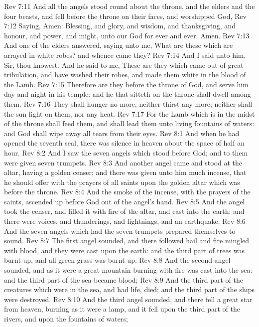 \vs Rev 7:11 And all the angels stood round about the throne, and  the elders and the four beasts, and fell before the throne on their faces, and worshipped God,
\vs Rev 7:12 Saying, Amen: Blessing, and glory, and wisdom, and thanksgiving, and honour, and power, and might,  unto our God for ever and ever. Amen.
\vs Rev 7:13 And one of the elders answered, saying unto me, What are these which are arrayed in white robes? and whence came they?
\vs Rev 7:14 And I said unto him, Sir, thou knowest. And he said to me, These are they which came out of great tribulation, and have washed their robes, and made them white in the blood of the Lamb.
\vs Rev 7:15 Therefore are they before the throne of God, and serve him day and night in his temple: and he that sitteth on the throne shall dwell among them.
\vs Rev 7:16 They shall hunger no more, neither thirst any more; neither shall the sun light on them, nor any heat.
\vs Rev 7:17 For the Lamb which is in the midst of the throne shall feed them, and shall lead them unto living fountains of waters: and God shall wipe away all tears from their eyes.
\vs Rev 8:1 And when he had opened the seventh seal, there was silence in heaven about the space of half an hour.
\vs Rev 8:2 And I saw the seven angels which stood before God; and to them were given seven trumpets.
\vs Rev 8:3 And another angel came and stood at the altar, having a golden censer; and there was given unto him much incense, that he should offer  with the prayers of all saints upon the golden altar which was before the throne.
\vs Rev 8:4 And the smoke of the incense,  with the prayers of the saints, ascended up before God out of the angel's hand.
\vs Rev 8:5 And the angel took the censer, and filled it with fire of the altar, and cast  into the earth: and there were voices, and thunderings, and lightnings, and an earthquake.
\vs Rev 8:6 And the seven angels which had the seven trumpets prepared themselves to sound.
\vs Rev 8:7 The first angel sounded, and there followed hail and fire mingled with blood, and they were cast upon the earth: and the third part of trees was burnt up, and all green grass was burnt up.
\vs Rev 8:8 And the second angel sounded, and as it were a great mountain burning with fire was cast into the sea: and the third part of the sea became blood;
\vs Rev 8:9 And the third part of the creatures which were in the sea, and had life, died; and the third part of the ships were destroyed.
\vs Rev 8:10 And the third angel sounded, and there fell a great star from heaven, burning as it were a lamp, and it fell upon the third part of the rivers, and upon the fountains of waters;
